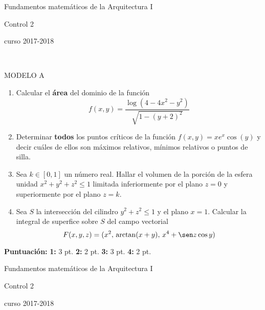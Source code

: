 \documentclass[a4paper, 12pt]{article}
\begin{document}
\pagestyle {empty}
\begin{center}
\LARGE
Fundamentos matemáticos de la Arquitectura I

\Large
Control 2

\large
curso 2017-2018
\end{center}

\

\large

MODELO A
\vskip 5mm
\begin{enumerate}
\item
Calcular el {\bf área} del dominio de la función
$$
f(x,y)=\frac{\log(4-4x^2-y^2)}{\sqrt{1-(y+2)^2}}
$$
\vskip 25mm


\item
Determinar {\bf todos} los puntos críticos de la función
$
f(x,y)=x e^x \cos(y)
$
y decir cuáles de ellos son máximos relativos, mínimos relativos o puntos de silla.
\vskip 25mm



\item
Sea $k\in[0,1]$ un número real.
Hallar el volumen de la porción de la esfera unidad $x^2+y^2+z^2\le1$ limitada inferiormente por el plano $z=0$ y superiormente por el plano $z=k$.
\vskip 25mm


\item
Sea $S$ la intersección del cilindro $y^2+z^2\le1$ y el plano $x=1$. Calcular la integral de superfice sobre $S$ del campo vectorial
$$
F(x,y,z)=(x^2, \, \arctan (x+y), \, x^4+\sen z \cos y)
$$
\vskip 25mm
\end{enumerate}

\vfill
\normalsize
\noindent
{\bf Puntuación:}
\hskip 10mm
{\bf 1:} 3 pt. \hskip 16mm 
{\bf 2:} 2 pt. \hskip 16mm
{\bf 3:} 3 pt. \hskip 16mm
{\bf 4:} 2 pt.


\pagebreak


\begin{center}
\LARGE
Fundamentos matemáticos de la Arquitectura I

\Large
Control 2

\large
curso 2017-2018
\end{center}

\

\large
\end{document}

